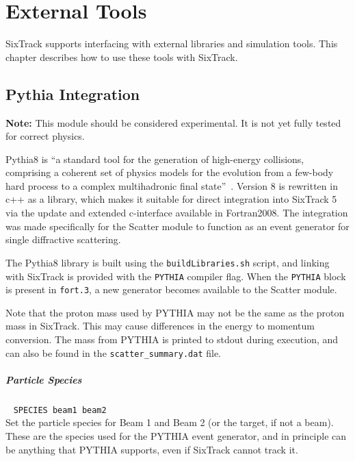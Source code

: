 
\chapter{External Tools} \label{ExtTools}

SixTrack supports interfacing with external libraries and simulation tools.
This chapter describes how to use these tools with SixTrack.

\section{Pythia Integration} \label{ExtPythia}

\textcolor{notered}{\textbf{Note:} This module should be considered experimental. It is not yet fully tested for correct physics.}

Pythia8 is ``a standard tool for the generation of high-energy collisions, comprising a coherent set of physics models for the evolution from a few-body hard process to a complex multihadronic final state''~\cite{pythia8}.
Version 8 is rewritten in c++ as a library, which makes it suitable for direct integration into SixTrack 5 via the update and extended c-interface available in Fortran2008.
The integration was made specifically for the Scatter module to function as an event generator for single diffractive scattering.

The Pythia8 library is built using the \texttt{buildLibraries.sh} script, and linking with SixTrack is provided with the \texttt{PYTHIA} compiler flag.
When the \texttt{PYTHIA} block is present in \texttt{fort.3}, a new generator becomes available to the Scatter module.

Note that the proton mass used by PYTHIA may not be the same as the proton mass in SixTrack.
This may cause differences in the energy to momentum conversion.
The mass from PYTHIA is printed to stdout during execution, and can also be found in the \texttt{scatter\_summary.dat} file.

\paragraph{Particle Species}~ \texttt{SPECIES beam1 beam2}\\

Set the particle species for Beam 1 and Beam 2 (or the target, if not a beam).
These are the species used for the PYTHIA event generator, and in principle can be anything that PYTHIA supports, even if SixTrack cannot track it.

